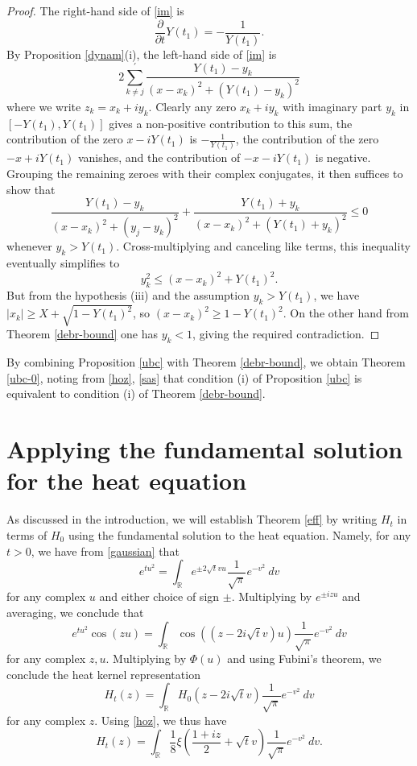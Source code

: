 \documentclass[a4paper,11pt,twoside]{amsart}
\newcommand\R{\mathbb{R}}
\begin{document}
\begin{proof}
The right-hand side of \eqref{im} is
$$ \frac{\partial}{\partial t} Y(t_1) = -\frac{1}{Y(t_1)}.$$
By Proposition \ref{dynam}(i), the left-hand side of \eqref{im} is
$$ 2 \sum_{k \neq j}^{\prime} \frac{Y(t_1) - y_k}{(x-x_k)^2 + (Y(t_1)-y_k)^2}$$
where we write $z_k = x_k + i y_k$.  Clearly any zero $x_k+iy_k$ with imaginary part $y_k$ in $[-Y(t_1),Y(t_1)]$ gives a non-positive contribution to this sum, the contribution of the zero $x- iY(t_1)$ is $-\frac{1}{Y(t_1)}$, the contribution of the zero $-x+iY(t_1)$ vanishes, and the contribution of $-x-iY(t_1)$ is negative.  Grouping the remaining zeroes with their complex conjugates, it then suffices to show that
$$ \frac{Y(t_1) - y_k}{(x-x_k)^2 + (y_j-y_k)^2} + \frac{Y(t_1) + y_k}{(x-x_k)^2 + (Y(t_1)+y_k)^2} \leq 0$$
whenever $y_k > Y(t_1)$.  Cross-multiplying and canceling like terms, this inequality eventually simplifies to
$$ y_k^2 \leq (x-x_k)^2 + Y(t_1)^2.$$
But from the hypothesis (iii) and the assumption $y_k > Y(t_1)$, we have $|x_k| \geq X+\sqrt{1-Y(t_1)^2}$, so $(x-x_k)^2 \geq 1-Y(t_1)^2$.  On the other hand from Theorem \ref{debr-bound} one has $y_k < 1$, giving the required contradiction.
\end{proof}

By combining Proposition \ref{ubc} with Theorem \ref{debr-bound}, we obtain Theorem \ref{ubc-0}, noting from \eqref{hoz}, \eqref{sas} that condition (i) of Proposition \ref{ubc} is equivalent to condition (i) of Theorem \ref{debr-bound}.

\section{Applying the fundamental solution for the heat equation}\label{heatflow-sec}

As discussed in the introduction, we will establish Theorem \ref{eff} by writing $H_t$ in terms of $H_0$ using the fundamental solution to the heat equation.  Namely, for any $t>0$, we have from \eqref{gaussian} that
$$
e^{tu^2} = \int_\R e^{\pm 2 \sqrt{t} vu} \frac{1}{\sqrt{\pi}} e^{-v^2}\ dv$$
for any complex $u$ and either choice of sign $\pm$. Multiplying by $e^{\pm i zu}$ and averaging, we conclude that
$$
e^{tu^2} \cos(zu) = \int_\R \cos\left(\left(z - 2 i \sqrt{t} v\right)u\right) \frac{1}{\sqrt{\pi}} e^{-v^2}\ dv$$
for any complex $z,u$.  Multiplying by $\Phi(u)$ and using Fubini's theorem, we conclude the heat kernel representation
$$ H_t(z) = \int_\R H_0( z - 2i \sqrt{t} v ) \frac{1}{\sqrt{\pi}} e^{-v^2}\ dv $$
for any complex $z$.  Using \eqref{hoz}, we thus have
\begin{equation}\label{htz}
 H_t(z) = \int_\R \frac{1}{8} \xi\left( \frac{1+iz}{2} + \sqrt{t} v \right) \frac{1}{\sqrt{\pi}} e^{-v^2}\ dv.
\end{equation}
\end{document}
